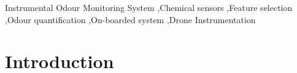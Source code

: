\documentclass[final,3p,times,twocolumn]{elsarticle}
\begin{document}
\begin{frontmatter}
\begin{keyword}
Instrumental Odour Monitoring System  \sep Chemical sensors  \sep Feature selection  \sep Odour quantification  \sep On-boarded system \sep Drone Instrumentation
\end{keyword}

\end{frontmatter}


\section{Introduction}
\label{sec:intro}


\end{document}
